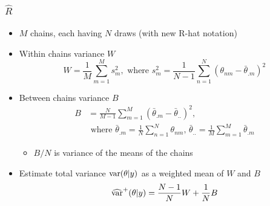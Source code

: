 \documentclass[10pt]{beamer}
\begin{document}
\begin{frame}[fragile]
\begin{itemize}
  \end{itemize}

\end{frame}

\begin{frame}

\frametitle{ $\widehat{R}$}

  \begin{itemize}
  \item $M$ chains, each having $N$ draws (with new R-hat notation)
  \item<2-> Within chains variance $W$
    \begin{equation*}
      W=\frac{1}{M}\sum_{m=1}^M s^2_m ,\text{ where }
      s^2_m=\frac{1}{N-1}\sum_{n=1}^N (\theta_{nm}-\bar{\theta}_{.m})^2
    \end{equation*}
  \item<3-> Between chains variance $B$
    \begin{align*}
      B&=\frac{N}{M-1}\sum_{m=1}^M
      (\bar{\theta}_{.m}-\bar{\theta}_{..})^2,\\
      &\text{ where } \bar{\theta}_{.m}=\frac{1}{N}\sum_{n=1}^N \theta_{nm}, \,
      \bar{\theta}_{..}=\frac{1}{M}\sum_{m=1}^M\bar{\theta}_{.m}
    \end{align*}
    \begin{itemize}
      \item<4-> $B/N$ is variance of the means of the chains
    \end{itemize}
    \vspace{2mm}
  \item<5-> Estimate total variance
    $\mathrm{var}(\theta|y)$ as a weighted mean of $W$ and $B$
    \begin{equation*}
      \widehat{\mathrm{var}}^{+}(\theta|y) = \frac{N-1}{N}W+\frac{1}{N}B
    \end{equation*}
  \end{itemize}

\end{frame}
\end{document}
